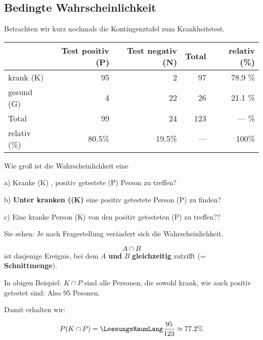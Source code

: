 
\subsection{Bedingte Wahrscheinlichkeit}

Betrachten wir kurz nochmals die Kontingenztafel zum Krankheitstest.


  \begin{tabular}{|l|r|r|r|r|}\hline
                    & Test positiv (P) & Test negativ (N) & Total & relativ (\%) \\\hline
    krank (K)       & 95               & 2                & 97    & 78.9 \%      \\\hline    
    gesund (G)      & 4                & 22               & 26    & 21.1 \%      \\\hline
    Total           & 99               & 24               & 123   &  --- \%      \\\hline
    relativ (\%)    & 80.5\%           & 19.5\%           & ---   &   100\%      \\\hline
  \end{tabular}



Wie groß ist die Wahrscheinlichkeit eine

a) Kranke (K) , positiv getestete (P) Person zu treffen? 

b) \textbf{Unter kranken ((K)} eine positiv getestete Person (P) zu finden? 

c) Eine kranke Person (K) von den positiv getesteten (P) zu treffen?? 

Sie sehen: Je nach Fragestellung verändert sich die Wahrscheinlichkeit.


\begin{definition}{}{}
$$A\cap B$$ ist dasjenige Ereignis, bei dem $A$ \textbf{und} $B$
\textbf{gleichzeitig} zutrifft (= \textbf{Schnittmenge}).
\end{definition}

In obigen Beispiel: $K \cap P$ sind alle Personen, die sowohl
krank, wie auch positiv getestet sind: Also 95 Pesonen.

Damit erhalten wir:

$$P(K\cap P) = \LoesungsRaumLang{\frac{95}{123} \approx 77.2\%}$$

